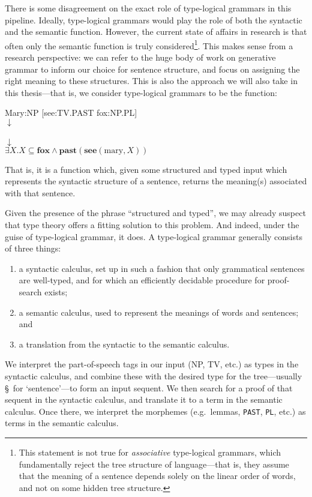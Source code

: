 There is some disagreement on the exact role of type-logical grammars in
this pipeline. Ideally, type-logical grammars would play the role of
both the syntactic and the semantic function. However, the current
state of affairs in research is that often only the semantic function
is truly considered\footnote{%
  This statement is not true for \emph{associative} type-logical
  grammars, which fundamentally reject the tree structure of
  language---that is, they assume that the meaning of a sentence
  depends solely on the linear order of words, and not on some hidden
  tree structure.
}. This makes sense from a research perspective: we can refer to the
huge body of work on generative grammar to inform our choice for
sentence structure, and focus on assigning the right meaning to these
structures. This is also the approach we will also take in this
thesis---that is, we consider type-logical grammars to be the
function:
\begin{center}
  Mary:NP [see:TV.PAST fox:NP.PL]\\
  $\downarrow$\\
  \\
  $\downarrow$\\
  $\exists X.X\subseteq\mathbf{fox}\land\mathbf{past}(\mathbf{see}(\text{mary},X))$
\end{center}
That is, it is a function which, given some structured and typed input
which represents the syntactic structure of a sentence, returns the
meaning(s) associated with that sentence.

Given the presence of the phrase ``structured and typed'', we may
already suspect that type theory offers a fitting solution to this
problem. And indeed, under the guise of type-logical grammar, it
does. A type-logical grammar generally consists of three things:
\begin{enumerate}[label=(\arabic*)]
\item a syntactic calculus, set up in such a fashion that only
  grammatical sentences are well-typed, and for which an efficiently
  decidable procedure for proof-search exists;
\item a semantic calculus, used to represent the meanings of words and
  sentences; and
\item a translation from the syntactic to the semantic calculus.
\end{enumerate}
We interpret the part-of-speech tags in our input (NP, TV, etc.) as
types in the syntactic calculus, and combine these with the desired
type for the tree---usually \S\ for `sentence'---to form an input
sequent.
We then search for a proof of that sequent in the syntactic calculus,
and translate it to a term in the semantic calculus.
Once there, we interpret the morphemes (e.g.\ lemmas, \texttt{PAST},
\texttt{PL}, etc.) as terms in the semantic calculus.

